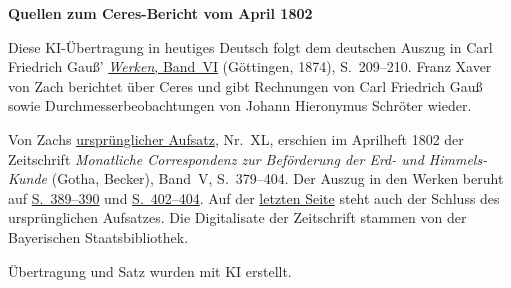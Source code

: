 \clearpage\thispagestyle{empty}
\begin{center}\textbf{Quellen zum Ceres-Bericht vom April 1802}\end{center}
\noindent Diese KI-Übertragung in heutiges Deutsch folgt dem deutschen Auszug in Carl Friedrich Gauß’ \href{https://gdz.sub.uni-goettingen.de/id/PPN236007467}{\textit{Werken}, Band~VI} (Göttingen, 1874), S.~209--210. Franz Xaver von Zach berichtet über Ceres und gibt Rechnungen von Carl Friedrich Gauß sowie Durchmesserbeobachtungen von Johann Hieronymus Schröter wieder.
\par\smallskip\noindent Von Zachs \href{https://api.digitale-sammlungen.de/iiif/image/v2/bsb10538597_00391/full/1450,/0/default.jpg}{ursprünglicher Aufsatz}, Nr.~XL, erschien im Aprilheft 1802 der Zeitschrift \textit{Monatliche Correspondenz zur Beförderung der Erd- und Himmels-Kunde} (Gotha, Becker), Band~V, S.~379--404. Der Auszug in den Werken beruht auf \href{https://api.digitale-sammlungen.de/iiif/image/v2/bsb10538597_00401/full/1450,/0/default.jpg}{S.~389--390} und \href{https://api.digitale-sammlungen.de/iiif/image/v2/bsb10538597_00414/full/1450,/0/default.jpg}{S.~402--404}. Auf der \href{https://api.digitale-sammlungen.de/iiif/image/v2/bsb10538597_00416/full/1450,/0/default.jpg}{letzten Seite} steht auch der Schluss des ursprünglichen Aufsatzes. Die Digitalisate der Zeitschrift stammen von der Bayerischen Staatsbibliothek.
\par\smallskip\noindent Übertragung und Satz wurden mit KI erstellt.
\clearpage
